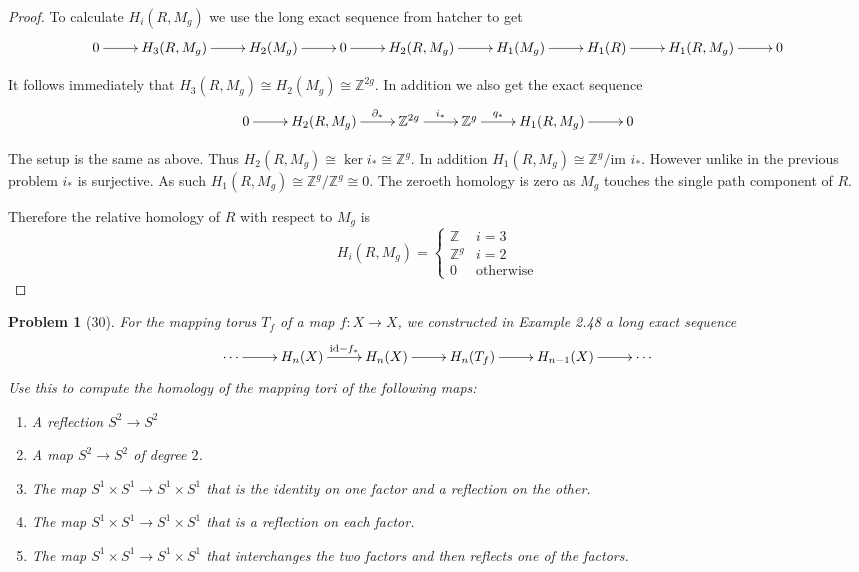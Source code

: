 \documentclass[10pt]{article}
\newcommand{\sk}{\vskip 10mm}
\newcommand{\bb}[1]{\mathbb{#1}}
\theoremstyle{plain}
\newtheorem{problem}{Problem}
\theoremstyle{remark}
\begin{document}
\begin{proof}
  \sk

  To calculate $H_i(R,M_g)$ we use the long exact sequence from hatcher to get
  \[
    \xymatrix{
      0 \ar[r] & H_3(R,M_g) \ar[r] & H_2(M_g) \ar[r] & 0 \ar[r] & H_2(R,M_g) \ar[r] & H_1(M_g) \ar[r] & H_1(R) \ar[r] & H_1(R,M_g) \ar[r] & 0
    }
  \]

  It follows immediately that $H_3(R,M_g)\cong H_2(M_g)\cong \bb{Z}^{2g}$. In addition we also get
  the exact sequence
  \[
    \xymatrix{
      0 \ar[r] & H_2(R,M_g) \ar[r]^-{\partial_*} & \bb{Z}^{2g} \ar[r]^-{i_*} & \bb{Z}^g \ar[r]^-{q_*} & H_1(R,M_g) \ar[r] & 0
    }
  \]

  The setup is the same as above. Thus $H_2(R,M_g)\cong \ker i_*\cong\bb{Z}^g$. In addition
  $H_1(R,M_g)\cong \bb{Z}^g/\text{im\ }i_*$. However unlike in the previous problem $i_*$
  is surjective. As such $H_1(R,M_g)\cong \bb{Z}^g/\bb{Z}^g\cong 0$. The zeroeth homology is
  zero as $M_g$ touches the single path component of $R$.

  Therefore the relative homology of $R$ with respect to $M_g$ is
  \[
    H_i(R,M_g) = 
    \left\{
      \begin{array}{cr}
        \bb{Z} & i=3\\
        \bb{Z}^g & i=2\\
        0 & \text{otherwise}
      \end{array}
    \right.
  \]
\end{proof}

\sk

\begin{problem}[30]
  For the mapping torus $T_f$ of a map $f: X\rightarrow X$,
  we constructed in Example 2.48 a long exact sequence
  \[
    \xymatrix{
      \cdots \ar[r] & H_n(X) \ar[r]^{\mathrm{id}-f_*} & H_n(X) \ar[r] & H_n(T_f) \ar[r] & H_{n-1}(X) \ar[r] & \cdots
    }
  \]
  Use this to compute the homology of the mapping tori of the following maps:
  \begin{enumerate}
  \item[(a)] A reflection $S^2\rightarrow S^2$
  \item[(b)] A map $S^2\rightarrow S^2$ of degree $2$.
  \item[(c)] The map $S^1\times S^1\rightarrow S^1\times S^1$ that is the
    identity on one factor and a reflection on the other.
  \item[(d)] The map $S^1\times S^1\rightarrow S^1\times S^1$ that is a
    reflection on each factor.
  \item[(e)] The map $S^1\times S^1\rightarrow S^1\times S^1$ that interchanges
    the two factors and then reflects one of the factors.
  \end{enumerate}
\end{problem}
\end{document}
